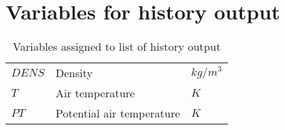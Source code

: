 \chapter{Variables for history output}
\label{sec:vari_hist}

\begin{table}[htbp]
  \label{tb:vari_hist}
  \caption{Variables assigned to list of history output}
  \begin{tabular}{lll}\hline
    $DENS$ & Density                       &  $kg/m^3$ \\
    $T$    & Air temperature               &  $K$   \\
    $PT$   & Potential air temperature     &  $K$   \\
    \hline
  \end{tabular}
\end{table}
